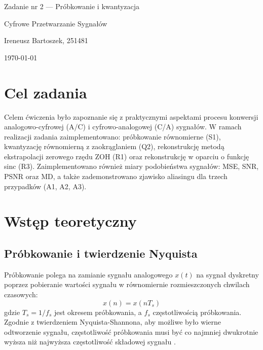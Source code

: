 \documentclass[12pt]{article}
\begin{document}
\begin{titlepage}
    \centering
    \vspace*{2cm}
    {\Large Zadanie nr 2 --- Próbkowanie i kwantyzacja \par}
    \vspace{0.5cm}
    {\large Cyfrowe Przetwarzanie Sygnałów \par}
    \vspace{2cm}
    {\large Ireneusz Bartoszek, 251481 \par}
    \vspace{0.5cm}
    {\large \today \par}
\end{titlepage}

\section{Cel zadania}

Celem ćwiczenia było zapoznanie się z praktycznymi aspektami procesu konwersji
analogowo-cyfrowej (A/C) i cyfrowo-analogowej (C/A) sygnałów.
W ramach realizacji zadania zaimplementowano:
próbkowanie równomierne (S1),
kwantyzację równomierną z zaokrąglaniem (Q2),
rekonstrukcję metodą ekstrapolacji zerowego rzędu ZOH (R1)
oraz rekonstrukcję w oparciu o funkcję sinc (R3).
Zaimplementowano również miary podobieństwa sygnałów: MSE, SNR, PSNR oraz MD,
a także zademonstrowano zjawisko aliasingu dla trzech przypadków (A1, A2, A3).

\section{Wstęp teoretyczny}

\subsection{Próbkowanie i twierdzenie Nyquista}

Próbkowanie polega na zamianie sygnału analogowego $x(t)$ na sygnał dyskretny
poprzez pobieranie wartości sygnału w równomiernie rozmieszczonych chwilach czasowych:
\begin{equation}
    x(n) = x(nT_s)
\end{equation}
gdzie $T_s = 1/f_s$ jest okresem próbkowania, a $f_s$ częstotliwością próbkowania.
Zgodnie z twierdzeniem Nyquista-Shannona, aby możliwe było wierne odtworzenie sygnału,
częstotliwość próbkowania musi być co najmniej dwukrotnie wyższa niż najwyższa
częstotliwość składowej sygnału \cite{instrukcja do zadania}.
\end{document}
